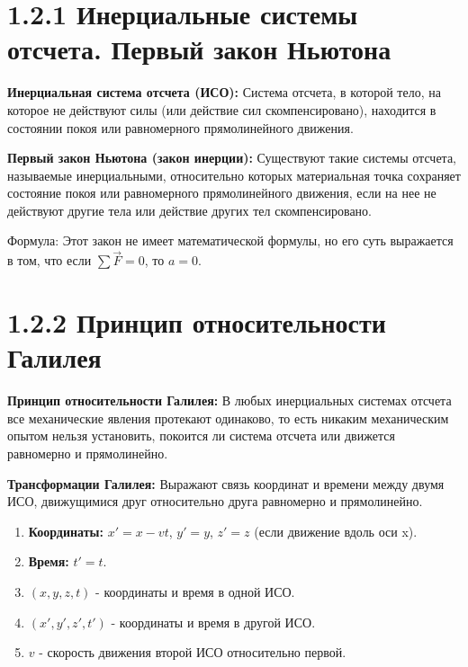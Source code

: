 \documentclass[a4paper,12pt]{article}
\begin{document}
\begin{center}
\end{center}

\section*{1.2.1 Инерциальные системы отсчета. Первый закон Ньютона}
\vspace{-9pt}
\textbf{Инерциальная система отсчета (ИСО):} Система отсчета, в которой тело, на которое не действуют силы (или действие сил скомпенсировано), находится в состоянии покоя или равномерного прямолинейного движения.
\vspace{-3pt}

\textbf{Первый закон Ньютона (закон инерции):} Существуют такие системы отсчета, называемые инерциальными, относительно которых материальная точка сохраняет состояние покоя или равномерного прямолинейного движения, если на нее не действуют другие тела или действие других тел скомпенсировано.
\vspace{-3pt}

Формула: Этот закон не имеет математической формулы, но его суть выражается в том, что если $\sum{\vec{F}} = 0$, то $a = 0$.

\section*{1.2.2 Принцип относительности Галилея}
\vspace{-9pt}
\textbf{Принцип относительности Галилея:} В любых инерциальных системах отсчета все механические явления протекают одинаково, то есть никаким механическим опытом нельзя установить, покоится ли система отсчета или движется равномерно и прямолинейно.
\vspace{-3pt}

\textbf{Трансформации Галилея:} Выражают связь координат и времени между двумя ИСО, движущимися друг относительно друга равномерно и прямолинейно.
\begin{enumerate} [itemsep=0pt, topsep=0pt, parsep=3pt]
    \item \textbf{Координаты:} $x' = x - vt$, $y' = y$, $z' = z$ (если движение вдоль оси x).
    \item \textbf{Время:} $t' = t$.
    \item $(x, y, z, t)$ - координаты и время в одной ИСО.
    \item $(x', y', z', t')$ - координаты и время в другой ИСО.
    \item $v$ - скорость движения второй ИСО относительно первой.
\end{enumerate}
\end{document}

